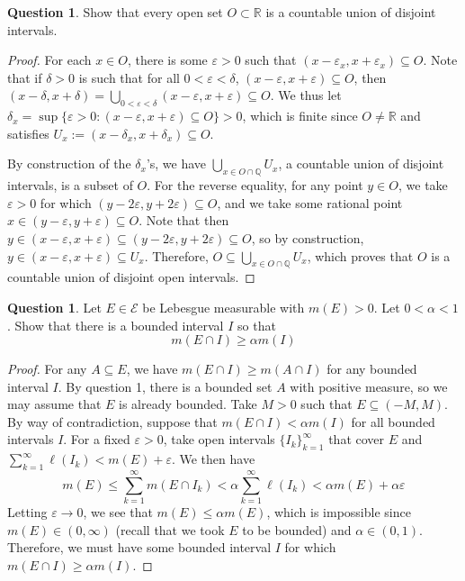 \documentclass{article}
\newcommand{\Q}{\mathbb{Q}}
\newcommand{\R}{\mathbb{R}}
\theoremstyle{definition} %
\numberwithin{thm}{section} %
\theoremstyle{definition} %
\newtheorem{question}[thm]{Question}
\begin{document}
\begin{question}
Show that every open set $O \subset \mathbb{R}$ is a countable union of disjoint intervals.
\end{question}
\begin{proof}
For each $x \in O$, there is some $\varepsilon > 0$ such that $(x - \varepsilon_x, x + \varepsilon_x) \subseteq O$. Note that if $\delta > 0$ is such that for all $0 < \varepsilon < \delta$, $(x - \varepsilon, x + \varepsilon) \subseteq O$, then $(x - \delta, x + \delta) = \bigcup_{0 < \varepsilon < \delta} (x - \varepsilon, x + \varepsilon) \subseteq O$. We thus let $\delta_x = \sup\{\varepsilon > 0: (x - \varepsilon, x + \varepsilon) \subseteq O\} > 0$, which is finite since $O \neq \R$ and satisfies $U_x := (x - \delta_x, x + \delta_x) \subseteq O$.

By construction of the $\delta_x$'s, we have $\bigcup_{x \in O \cap \Q} U_x$, a countable union of disjoint intervals, is a subset of $O$. For the reverse equality, for any point $y \in O$, we take $\varepsilon > 0$ for which $(y - 2\varepsilon, y + 2\varepsilon) \subseteq O$, and we take some rational point $x \in (y - \varepsilon, y + \varepsilon) \subseteq O$. Note that then $y \in (x - \varepsilon, x + \varepsilon) \subseteq (y - 2\varepsilon, y + 2\varepsilon) \subseteq O$, so by construction, $y \in (x - \varepsilon, x + \varepsilon) \subseteq U_x$. Therefore, $O \subseteq \bigcup_{x \in O \cap \Q} U_x$, which proves that $O$ is a countable union of disjoint open intervals.
\end{proof}

\begin{question}
Let $E \in \mathcal{E}$ be Lebesgue measurable with $m(E) > 0$. Let $0 < \alpha < 1$. Show that there is a bounded interval $I$ so that
\[ m(E \cap I) \geq \alpha m(I) \]
\end{question}
\begin{proof}
For any $A \subseteq E$, we have $m(E \cap I) \geq m(A \cap I)$ for any bounded interval $I$. By question 1, there is a bounded set $A$ with positive measure, so we may assume that $E$ is already bounded. Take $M > 0$ such that $E \subseteq (-M, M)$. By way of contradiction, suppose that $m(E \cap I) < \alpha m(I)$ for all bounded intervals $I$. For a fixed $\varepsilon > 0$, take open intervals ${\{I_k\}}_{k = 1}^\infty$ that cover $E$ and $\sum_{k = 1}^\infty \ell(I_k) < m(E) + \varepsilon$. We then have 
\[ m(E) \leq \sum_{k = 1}^\infty m(E \cap I_k) < \alpha \sum_{k = 1}^\infty \ell(I_k) < \alpha m(E) + \alpha\varepsilon \]
Letting $\varepsilon \to 0$, we see that $m(E) \leq \alpha m(E)$, which is impossible since $m(E) \in (0, \infty)$ (recall that we took $E$ to be bounded) and $\alpha \in (0, 1)$. Therefore, we must have some bounded interval $I$ for which $m(E \cap I) \geq \alpha m(I)$.
\end{proof}
    
\end{document}
